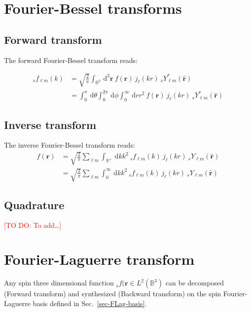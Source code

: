 \documentclass[a4paper,11pt]{article}
\newcommand{\realsnn}{\ensuremath{{\mathbb{R}^{+}}}}
\newcommand{\ball}{\ensuremath{{\mathbb{B}^3}}}
\newcommand{\dx}{\ensuremath{\mathrm{\,d}}}
\newcommand{\rvec}{{\boldsymbol{r}}}
\newcommand{\rang}{{\boldsymbol{\hat{r}}}}
\newcommand{\rlen}{{r}}
\newcommand{\todo}[1]{\textcolor{red}{[TO DO: #1]}}
\begin{document}
\section{Fourier-Bessel transforms}



\subsection{Forward transform}

The forward Fourier-Bessel transform reads:

\begin{align}
  {}_s f_{\ell m}(k) 
  & = 
  \sqrt{\frac{2}{\pi}} 
  \int_{\ball} \dx ^3 \rvec \:
  f(\rvec) \:
  j_\ell(k\rlen) \:
  {}_s Y_{\ell m}^\ast(\rang) \\
  & =  
  \int_0^{\pi}\dx \theta 
  \int_0^{2\pi} \dx \phi
  \int_0^\infty \dx \rlen 
  \rlen^2 \:
  f(\rvec) \:
  j_\ell(k\rlen) \:
  {}_s Y_{\ell m}^\ast(\rang) 
\end{align}

\subsection{Inverse transform}

The inverse Fourier-Bessel transform reads:
\begin{align}
  f(\rvec) 
  & =  
  \sqrt{\frac{2}{\pi}} 
  \sum_{\ell m}
  \int_{\realsnn} \dx k k^2 \:
  {}_s f_{\ell m}(k) \:
  j_\ell(k\rlen) \:
  {}_s Y_{\ell m}(\rang) \\
  & =
  \sqrt{\frac{2}{\pi}} 
  \sum_{\ell m}
  \int_0^\infty \dx k k^2 \:
  {}_s f_{\ell m}(k) \:
  j_\ell(k\rlen) \:
  {}_s Y_{\ell m}(\rang) 
\end{align}

\subsection{Quadrature}

\todo{To add\ldots}

\section{Fourier-Laguerre transform}
Any spin three dimensional function ${}_sf(\rvec \in L^2(\ball)$ can be decomposed (Forward transform) and  synthesized (Backward transform) on the spin Fourier-Laguerre basis defined in Sec.~\ref{sec-FLag-basis}.
%
\end{document}
